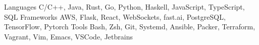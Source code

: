 
\begin{cvskills}
  \cvskill
    {Languages}
    {C/C++, Java, Rust, Go, Python, Haskell, JavaScript, TypeScript, SQL}
  \cvskill
    {Frameworks}
    {AWS, Flask, React, WebSockets, fast.ai, PostgreSQL, TensorFlow, Pytorch}
  \cvskill
    {Tools}
    {Bash, Zsh, Git, Systemd, Ansible, Packer, Terraform, Vagrant, Vim, Emacs, VSCode, Jetbrains}
\end{cvskills}

